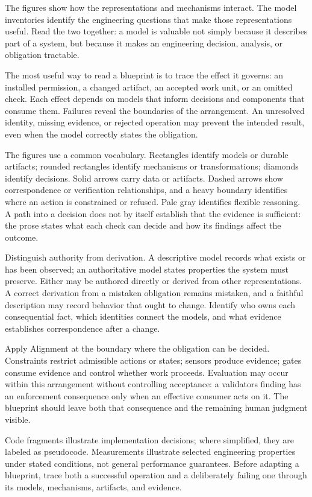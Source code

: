 
The figures show how the representations and mechanisms interact. The model inventories identify the engineering questions that make those representations useful. Read the two together: a model is valuable not simply because it describes part of a system, but because it makes an engineering decision, analysis, or obligation tractable.

The most useful way to read a blueprint is to trace the effect it governs: an installed permission, a changed artifact, an accepted work unit, or an omitted check. Each effect depends on models that inform decisions and components that consume them. Failures reveal the boundaries of the arrangement. An unresolved identity, missing evidence, or rejected operation may prevent the intended result, even when the model correctly states the obligation.

The figures use a common vocabulary. Rectangles identify models or durable artifacts; rounded rectangles identify mechanisms or transformations; diamonds identify decisions. Solid arrows carry data or artifacts. Dashed arrows show correspondence or verification relationships, and a heavy boundary identifies where an action is constrained or refused. Pale gray identifies flexible reasoning. A path into a decision does not by itself establish that the evidence is sufficient: the prose states what each check can decide and how its findings affect the outcome.

Distinguish authority from derivation. A descriptive model records what exists or has been observed; an authoritative model states properties the system must preserve. Either may be authored directly or derived from other representations. A correct derivation from a mistaken obligation remains mistaken, and a faithful description may record behavior that ought to change. Identify who owns each consequential fact, which identities connect the models, and what evidence establishes correspondence after a change.

Apply Alignment at the boundary where the obligation can be decided. Constraints restrict admissible actions or states; sensors produce evidence; gates consume evidence and control whether work proceeds. Evaluation may occur within this arrangement without controlling acceptance: a validator\textquotesingle s finding has an enforcement consequence only when an effective consumer acts on it. The blueprint should leave both that consequence and the remaining human judgment visible.

Code fragments illustrate implementation decisions; where simplified, they are labeled as pseudocode. Measurements illustrate selected engineering properties under stated conditions, not general performance guarantees. Before adapting a blueprint, trace both a successful operation and a deliberately failing one through its models, mechanisms, artifacts, and evidence.

